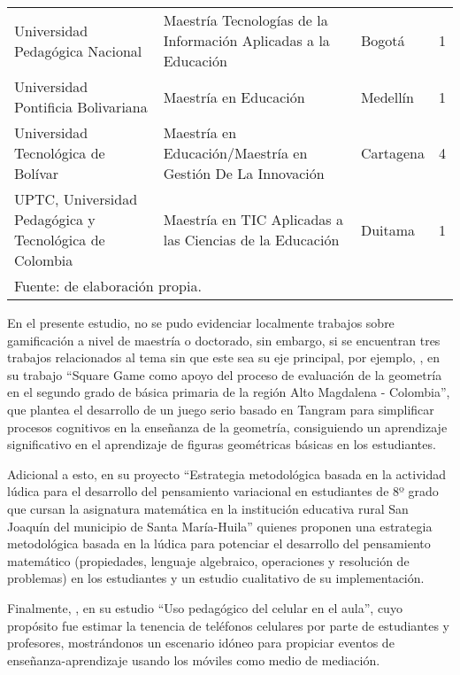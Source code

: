 \begin{table}[!htb]
\begin{center}
\begin{tabular}{ p{50mm} p{50mm} p{15mm} c}
	Universidad Pedagógica Nacional & Maestría Tecnologías de la Información Aplicadas a la Educación & 
		Bogotá & 1\\
	Universidad Pontificia Bolivariana & Maestría en Educación & Medellín & 1\\
	Universidad Tecnológica de Bolívar & Maestría en Educación/Maestría en Gestión De La Innovación & 
		Cartagena &  4\\
	UPTC, Universidad Pedagógica y Tecnológica de Colombia & Maestría en TIC Aplicadas a las Ciencias de 
		la Educación & Duitama & 1\\
\bottomrule
	\multicolumn{4}{l}{\footnotesize Fuente: de elaboración propia.}\\
\end{tabular}
\end{center}
\end{table}

En el presente estudio, no se pudo evidenciar localmente trabajos sobre gamificación a nivel de maestría o 
doctorado, sin embargo, si se encuentran tres trabajos relacionados al tema sin que este sea su eje principal,
por ejemplo, , en su trabajo ``Square Game como apoyo del proceso de evaluación de la 
geometría en el segundo grado de básica primaria de la región Alto Magdalena - Colombia'', que plantea el 
desarrollo de un juego serio basado en Tangram para simplificar procesos cognitivos en la enseñanza de la 
geometría, consiguiendo un aprendizaje significativo en el aprendizaje de figuras geométricas básicas en los 
estudiantes.

Adicional a esto,  en su proyecto ``Estrategia metodológica basada en la actividad lúdica para 
el desarrollo del pensamiento variacional en estudiantes de 8º grado que cursan la asignatura matemática en la 
institución educativa rural San Joaquín del municipio de Santa María-Huila'' quienes proponen una estrategia 
metodológica basada en la lúdica para potenciar el desarrollo del pensamiento matemático (propiedades, 
lenguaje algebraico, operaciones y resolución de problemas) en los estudiantes y un estudio cualitativo de su 
implementación.

Finalmente, , en su estudio ``Uso pedagógico del celular en el aula'', cuyo propósito fue 
estimar la tenencia de teléfonos celulares por parte de estudiantes y profesores, mostrándonos un escenario 
idóneo para propiciar eventos de enseñanza-aprendizaje usando los móviles como medio de mediación.

